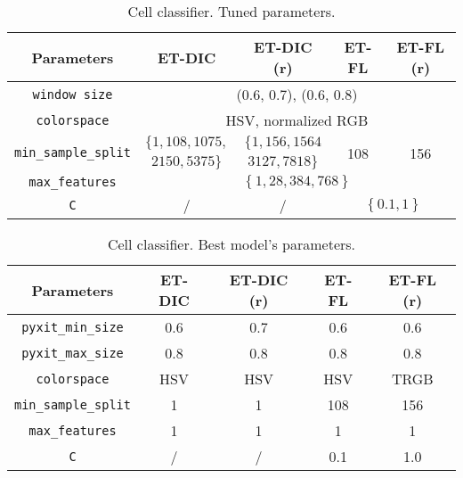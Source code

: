 \begin{table}
	\center 
	\begin{tabular}{|c|cccc|}
		\hline
		Parameters & ET-DIC & ET-DIC (r) & ET-FL & ET-FL (r) \\
		\hline		
		\texttt{window size} & \multicolumn{4}{|c|}{(0.6, 0.7), (0.6, 0.8)} \\
		\texttt{colorspace} & \multicolumn{4}{|c|}{HSV, normalized RGB} \\
		\multirow{2}{*}{\texttt{min\_sample\_split}} & $\{1, 108, 1075,$ &  $\{1, 156, 1564$ & \multirow{2}{*}{108} & \multirow{2}{*}{156}\\
		& $2150, 5375\}$ & $3127, 7818 \}$ & & \\
		\texttt{max\_features} & \multicolumn{4}{|c|}{$\left\{1, 28, 384, 768\right\}$}\\ 
		\texttt{C} & / & / & \multicolumn{2}{c|}{$\left\{0.1, 1\right\}$}\\
		\hline
	\end{tabular}
	\caption{Cell classifier. Tuned parameters.}
	\label{tab:app_cell_classif_tuned}
\end{table}

\begin{table}
	\small
	\center 
	\begin{tabular}{|c|c|c|c|c|}
		\hline
		Parameters & ET-DIC & ET-DIC (r) & ET-FL & ET-FL (r) \\
		\hline		
		\texttt{pyxit\_min\_size} & 0.6 & 0.7 & 0.6 & 0.6\\
		\texttt{pyxit\_max\_size} & 0.8 & 0.8 & 0.8 & 0.8\\
		\texttt{colorspace} & HSV & HSV & HSV & TRGB\\
		\texttt{min\_sample\_split} & 1 & 1 & 108 & 156\\
		\texttt{max\_features} & 1 & 1 & 1 & 1\\ 
		\texttt{C} & / & / & 0.1 & 1.0\\
		\hline
	\end{tabular}
	\caption{Cell classifier. Best model's parameters.}
	\label{tab:cell_classif_best_params}
\end{table}

